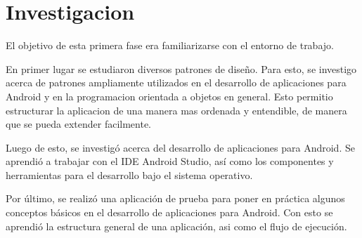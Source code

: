 \section{Investigacion} \label{sect:Investigacion}

El objetivo de esta primera fase era familiarizarse con el entorno de trabajo.

En primer lugar se estudiaron diversos patrones de diseño. Para esto, se investigo acerca de patrones ampliamente utilizados en el desarrollo de aplicaciones para Android y en la programacion orientada a objetos en general. Esto permitio estructurar la aplicacion de una manera mas ordenada y entendible, de manera que se pueda extender facilmente.

Luego de esto, se investigó acerca del desarrollo de aplicaciones para Android. Se aprendió a trabajar con el IDE Android Studio, así como los componentes y herramientas para el desarrollo bajo el sistema operativo.

Por último, se realizó una aplicación de prueba para poner en práctica algunos conceptos básicos en el desarrollo de aplicaciones para Android. Con esto se aprendió la estructura general de una aplicación, asi como el flujo de ejecución.


